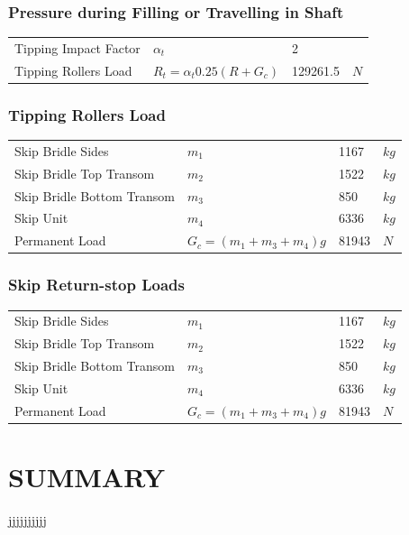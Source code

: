 \documentclass{article}%
\begin{document}
%
\subsubsection{Pressure during Filling or Travelling in Shaft}%
\label{ssubsec:PressureduringFillingorTravellinginShaft}%
\begin{flushleft}%
\begin{minipage}{\textwidth}%
\flushleft%
\begin{tabular}{l l l l}%
Tipping Impact Factor&$\alpha_t$&2&\\%
Tipping Rollers Load&$R_t = \alpha_t 0.25(R + G_c)$&129261.5&$N$\\%
\end{tabular}%
\end{minipage}%
\end{flushleft}

%
\subsubsection{Tipping Rollers Load}%
\label{ssubsec:TippingRollersLoad}%
\begin{flushleft}%
\begin{minipage}{\textwidth}%
\flushleft%
\begin{tabular}{l l l l}%
Skip Bridle Sides&$m_1$&1167&$kg$\\%
Skip Bridle Top Transom&$m_2$&1522&$kg$\\%
Skip Bridle Bottom Transom&$m_3$&850&$kg$\\%
Skip Unit&$m_4$&6336&$kg$\\%
Permanent Load&$G_c = (m_1 + m_3 + m_4)g$&81943&$N$\\%
\end{tabular}%
\end{minipage}%
\end{flushleft}

%
\subsubsection{Skip Return{-}stop Loads}%
\label{ssubsec:SkipReturn{-}stopLoads}%
\begin{flushleft}%
\begin{minipage}{\textwidth}%
\flushleft%
\begin{tabular}{l l l l}%
Skip Bridle Sides&$m_1$&1167&$kg$\\%
Skip Bridle Top Transom&$m_2$&1522&$kg$\\%
Skip Bridle Bottom Transom&$m_3$&850&$kg$\\%
Skip Unit&$m_4$&6336&$kg$\\%
Permanent Load&$G_c = (m_1 + m_3 + m_4)g$&81943&$N$\\%
\end{tabular}%
\end{minipage}%
\end{flushleft}

%
\newpage

%
\section{SUMMARY}%
\label{sec:SUMMARY}%
jjjjjjjjjj

%
\end{document}
